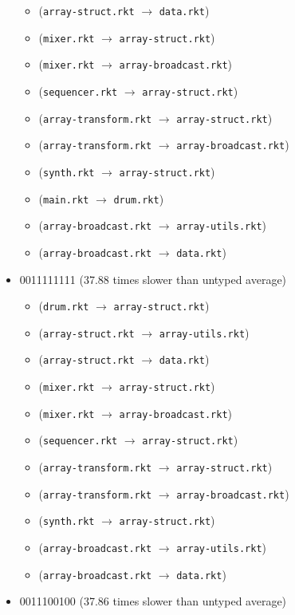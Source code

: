 \documentclass{article}
\newcommand{\mono}[1]{\texttt{#1}}
\begin{document}
\begin{itemize}
\begin{itemize}
  \item (\mono{array-struct.rkt} $\rightarrow$ \mono{data.rkt})
  \item (\mono{mixer.rkt} $\rightarrow$ \mono{array-struct.rkt})
  \item (\mono{mixer.rkt} $\rightarrow$ \mono{array-broadcast.rkt})
  \item (\mono{sequencer.rkt} $\rightarrow$ \mono{array-struct.rkt})
  \item (\mono{array-transform.rkt} $\rightarrow$ \mono{array-struct.rkt})
  \item (\mono{array-transform.rkt} $\rightarrow$ \mono{array-broadcast.rkt})
  \item (\mono{synth.rkt} $\rightarrow$ \mono{array-struct.rkt})
  \item (\mono{main.rkt} $\rightarrow$ \mono{drum.rkt})
  \item (\mono{array-broadcast.rkt} $\rightarrow$ \mono{array-utils.rkt})
  \item (\mono{array-broadcast.rkt} $\rightarrow$ \mono{data.rkt})
  \end{itemize}
\item 0011111111 (37.88 times slower than untyped average)
  \begin{itemize}
  \item (\mono{drum.rkt} $\rightarrow$ \mono{array-struct.rkt})
  \item (\mono{array-struct.rkt} $\rightarrow$ \mono{array-utils.rkt})
  \item (\mono{array-struct.rkt} $\rightarrow$ \mono{data.rkt})
  \item (\mono{mixer.rkt} $\rightarrow$ \mono{array-struct.rkt})
  \item (\mono{mixer.rkt} $\rightarrow$ \mono{array-broadcast.rkt})
  \item (\mono{sequencer.rkt} $\rightarrow$ \mono{array-struct.rkt})
  \item (\mono{array-transform.rkt} $\rightarrow$ \mono{array-struct.rkt})
  \item (\mono{array-transform.rkt} $\rightarrow$ \mono{array-broadcast.rkt})
  \item (\mono{synth.rkt} $\rightarrow$ \mono{array-struct.rkt})
  \item (\mono{array-broadcast.rkt} $\rightarrow$ \mono{array-utils.rkt})
  \item (\mono{array-broadcast.rkt} $\rightarrow$ \mono{data.rkt})
  \end{itemize}
\item 0011100100 (37.86 times slower than untyped average)

\end{itemize}
\end{document}
